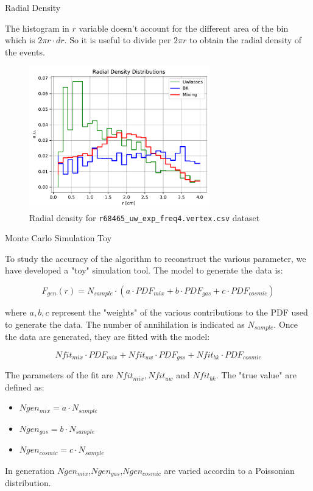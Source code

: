 \documentclass[9pt]{beamer}
\begin{document}
\begin{frame}{Radial Density}

The histogram in $r$ variable doesn't account for the different area of the bin which is $2 \pi r \cdot dr$. So it is useful to divide per $2 \pi r$ to obtain the radial density of the events.

\begin{figure}[hbtp]
\centering
\includegraphics[width = 0.7\textwidth]{RadialDensity.pdf}
\caption{Radial density for \texttt{r68465\_uw\_exp\_freq4.vertex.csv} dataset}
\end{figure}
\end{frame}

\begin{frame}[t]{Monte Carlo Simulation Toy}

To study the accuracy of the algorithm to reconstruct the various parameter, we have developed a "toy" simulation tool. The model to generate the data is:

\begin{equation}
F_{gen}(r) = N_{sample} \cdot (a \cdot PDF_{mix} + b \cdot PDF_{gas} + c \cdot PDF_{cosmic}) 
\end{equation}

where $a,b,c$ represent the "weights" of the various contributions to the PDF used to generate the data. The number of annihilation is indicated as $N_{sample}$. Once the data are generated, they are fitted with the model:

\begin{equation}
Nfit_{mix} \cdot PDF_{mix} + Nfit_{uw} \cdot PDF_{gas} + Nfit_{bk} \cdot PDF_{cosmic}
\end{equation}

The parameters of the fit are $Nfit_{mix}, Nfit_{uw}$ and $Nfit_{bk}$. The "true value" are defined as:

\begin{itemize}
\centering
\item $Ngen_{mix} = a \cdot N_{sample}$
\item $Ngen_{gas}  = b \cdot N_{sample}$
\item $Ngen_{cosmic}  = c \cdot N_{sample}$
\end{itemize} 

In generation $Ngen_{mix}$,$Ngen_{gas}$,$Ngen_{cosmic}$ are varied accordin to a Poissonian distribution. 
\end{frame}
\end{document}
